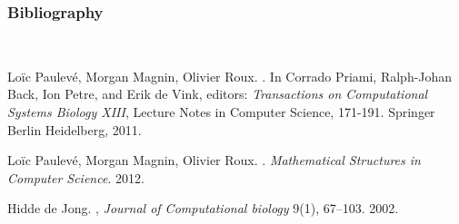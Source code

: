 
\begin{frame}[c]
  \frametitle{Bibliography}

\footnotesize
\setlength{\parindent}{-1em}
\setlength{\parskip}{0.5em}
~

\vfill

\tcitebullet Loïc Paulevé, Morgan Magnin, Olivier Roux. . In Corrado Priami, Ralph-Johan Back, Ion Petre, and Erik de Vink, editors: \textit{Transactions on Computational Systems Biology XIII}, Lecture Notes in Computer Science, 171-191. Springer Berlin Heidelberg, 2011.

\tcitebullet Loïc Paulevé, Morgan Magnin, Olivier Roux. . \textit{Mathematical Structures in Computer Science}. 2012.



\tcitebullet Hidde de Jong. , \textit{Journal of Computational biology} 9(1), 67--103. 2002.





\end{frame}

